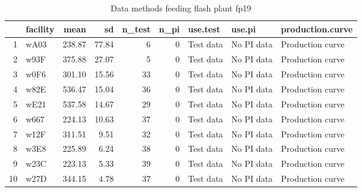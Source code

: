 \begin{table}[H]
\centering
\begin{tabular}{rlrrrrlll}
  \hline
 & facility & mean & sd & n\_test & n\_pi & use.test & use.pi & production.curve \\ 
  \hline
1 & wA03 & 238.87 & 77.84 &   6 &   0 & Test data & No PI data & Production curve \\ 
  2 & w93F & 375.88 & 27.07 &   5 &   0 & Test data & No PI data & Production curve \\ 
  3 & w0F6 & 301.10 & 15.56 &  33 &   0 & Test data & No PI data & Production curve \\ 
  4 & w82E & 536.47 & 15.04 &  36 &   0 & Test data & No PI data & Production curve \\ 
  5 & wE21 & 537.58 & 14.67 &  29 &   0 & Test data & No PI data & Production curve \\ 
  6 & w667 & 224.13 & 10.63 &  37 &   0 & Test data & No PI data & Production curve \\ 
  7 & w12F & 311.51 & 9.51 &  32 &   0 & Test data & No PI data & Production curve \\ 
  8 & w3E8 & 225.89 & 6.24 &  38 &   0 & Test data & No PI data & Production curve \\ 
  9 & w23C & 223.13 & 5.33 &  39 &   0 & Test data & No PI data & Production curve \\ 
  10 & w27D & 344.15 & 4.78 &  37 &   0 & Test data & No PI data & Production curve \\ 
   \hline
\end{tabular}
\caption{Data methods feeding flash plant fp19} 
\label{tab:well_summaries_fp16}
\end{table}
